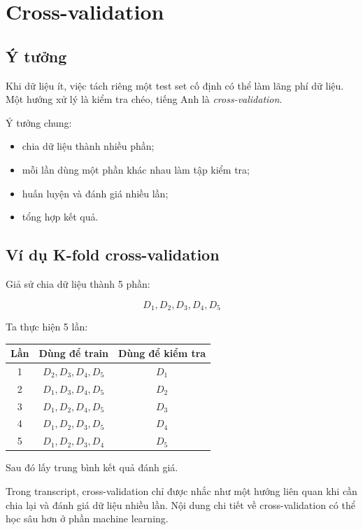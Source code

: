 \documentclass[12pt,a4paper]{report}
\begin{document}
\chapter{Cross-validation}

\section{Ý tưởng}

Khi dữ liệu ít, việc tách riêng một test set cố định có thể làm lãng phí dữ liệu. Một hướng xử lý là kiểm tra chéo, tiếng Anh là \textit{cross-validation}.

Ý tưởng chung:

\begin{itemize}
    \item chia dữ liệu thành nhiều phần;
    \item mỗi lần dùng một phần khác nhau làm tập kiểm tra;
    \item huấn luyện và đánh giá nhiều lần;
    \item tổng hợp kết quả.
\end{itemize}

\section{Ví dụ K-fold cross-validation}

Giả sử chia dữ liệu thành 5 phần:

\[
    D_1,D_2,D_3,D_4,D_5
\]

Ta thực hiện 5 lần:

\begin{center}
\begin{tabular}{ccc}
\toprule
Lần & Dùng để train & Dùng để kiểm tra \\
\midrule
1 & $D_2,D_3,D_4,D_5$ & $D_1$ \\
2 & $D_1,D_3,D_4,D_5$ & $D_2$ \\
3 & $D_1,D_2,D_4,D_5$ & $D_3$ \\
4 & $D_1,D_2,D_3,D_5$ & $D_4$ \\
5 & $D_1,D_2,D_3,D_4$ & $D_5$ \\
\bottomrule
\end{tabular}
\end{center}

Sau đó lấy trung bình kết quả đánh giá.

\begin{luuy}
Trong transcript, cross-validation chỉ được nhắc như một hướng liên quan khi cần chia lại và đánh giá dữ liệu nhiều lần. Nội dung chi tiết về cross-validation có thể học sâu hơn ở phần machine learning.
\end{luuy}
\end{document}
